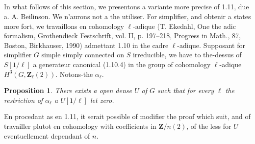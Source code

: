 \documentclass[11pt,a4paper]{article}
\theoremstyle{plain}
\newtheorem{proposition}[theorem]{Proposition}
\theoremstyle{definition}
\begin{document}
\subsection{}\label{1.12}

In what follows of this section, we presentons a variante more precise of 1.11, due a. A. Beilinson. We n'aurons not a the utiliser. For simplifier, and obtenir a states more fort, we travaillons en cohomology $\ell$-adique (T. Ekedahl, One the adic formalism, Grothendieck Festschrift, vol. II, p. 197--218, Progress in Math., 87, Boston, Birkhauser, 1990) admettant 1.10 in the cadre $\ell$-adique. Supposant for simplifier $G$ simple simply connected on $S$ irreducible, we have to the-dessus of $S[1/\ell]$ a generateur canonical (1.10.4) in the group of cohomology $\ell$-adique $H^3(G, \mathbf{Z}_\ell(2))$. Notons-the $\alpha_\ell$.

\begin{proposition}\label{1.13}
There exists a open dense $U$ of $G$ such that for every $\ell$ the restriction of $\alpha_\ell$ a $U[1/\ell]$ let zero.
\end{proposition}

En procedant as en 1.11, it serait possible of modifier the proof which suit, and of travailler plutot en cohomology with coefficients in $\mathbf{Z}/n(2)$, of the less for $U$ eventuellement dependant of $n$.
\end{document}
